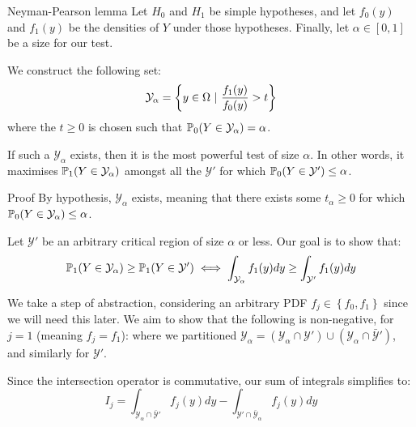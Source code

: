 \documentclass[a4paper]{article}
\begin{document}
\begin{parag}{Neyman-Pearson lemma}
    Let $H_0$ and $H_1$ be simple hypotheses, and let $f_0\left(y\right)$ and $f_1\left(y\right)$ be the densities of $Y$ under those hypotheses. Finally, let $\alpha \in \left[0, 1\right]$ be a size for our test.

    We construct the following set: 
    \[\mathcal{Y}_{\alpha} = \left\{y \in \Omega \suchthat \frac{f_1\left(y\right)}{f_0\left(y\right)} > t\right\}\]
    where the $t \geq 0$ is chosen such that $\prob_0\left(Y \in \mathcal{Y}_{\alpha}\right) = \alpha$.

    If such a $\mathcal{Y}_{\alpha}$ exists, then it is the most powerful test of size $\alpha$. In other words, it maximises $\prob_1\left(Y \in \mathcal{Y}_{\alpha}\right)$ amongst all the $\mathcal{Y}'$ for which $\prob_0\left(Y \in \mathcal{Y}'\right) \leq \alpha$.

    \begin{subparag}{Proof}
        By hypothesis, $\mathcal{Y}_{\alpha}$ exists, meaning that there exists some $t_{\alpha} \geq 0$ for which $\prob_0\left(Y \in \mathcal{Y}_{\alpha}\right) \leq \alpha$.

        Let $\mathcal{Y}'$ be an arbitrary critical region of size $\alpha$ or less. Our goal is to show that: 
        \[\prob_1\left(Y \in \mathcal{Y}_{\alpha}\right) \geq \prob_1\left(Y \in \mathcal{Y}'\right) \iff \int_{\mathcal{Y}_{\alpha}} f_1\left(y\right)dy \geq \int_{\mathcal{Y}'} f_1\left(y\right)dy\]
        
        We take a step of abstraction, considering an arbitrary PDF $f_j \in \left\{f_0, f_1\right\}$ since we will need this later. We aim to show that the following is non-negative, for $j=1$ (meaning $f_j = f_1$): 
        where we partitioned $\mathcal{Y}_{\alpha} = \left(\mathcal{Y}_{\alpha} \cap \mathcal{Y}'\right) \cup \left(\mathcal{Y}_{\alpha} \cap \bar{\mathcal{Y}}'\right)$, and similarly for $\mathcal{Y}'$.

        Since the intersection operator is commutative, our sum of integrals simplifies to: 
        \[I_j = \int_{\mathcal{Y}_{\alpha} \cap \bar{\mathcal{Y}}'} f_j\left(y\right)dy - \int_{\mathcal{Y}' \cap \bar{\mathcal{Y}}_{\alpha}} f_j\left(y\right)dy\]
        

\end{subparag}
\end{parag}
\end{document}
